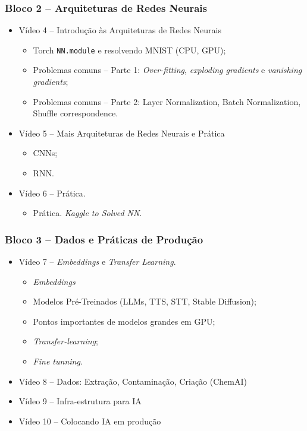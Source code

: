 \documentclass[a4paper,12pt, brazil]{article}
\begin{document}
    \subsubsection*{Bloco 2 -- Arquiteturas de Redes Neurais}
    \begin{itemize}
        \item Vídeo 4 -- Introdução às Arquiteturas de Redes Neurais
        \begin{itemize}
            \item Torch \verb|NN.module| e resolvendo MNIST (CPU, GPU);
            \item Problemas comuns -- Parte 1: \emph{Over-fitting}, \emph{exploding gradients} e \emph{vanishing gradients};
            \item Problemas comuns -- Parte 2: Layer Normalization, Batch Normalization, Shuffle correspondence.
        \end{itemize}
        
        \item Vídeo 5 -- Mais Arquiteturas de Redes Neurais e Prática
        \begin{itemize}
            \item CNNs;
            \item RNN.
        \end{itemize}
        
        \item Vídeo 6 -- Prática.
        \begin{itemize}
            \item Prática. \emph{Kaggle to Solved NN}.
        \end{itemize}
    \end{itemize}
    
    \subsubsection*{Bloco 3 -- Dados e Práticas de Produção}
    \begin{itemize}
        \item Vídeo 7 -- \emph{Embeddings} e \emph{Transfer Learning}.
        \begin{itemize}
            \item \emph{Embeddings}
            \item Modelos Pré-Treinados (LLMs, TTS, STT, Stable Diffusion);
            \item Pontos importantes de modelos grandes em GPU;
            \item \emph{Transfer-learning};
            \item \emph{Fine tunning}.
        \end{itemize}
        
        
        \item Vídeo 8 -- Dados: Extração, Contaminação, Criação (ChemAI)
    
        
        \item Vídeo 9 -- Infra-estrutura para IA
        
        \item Vídeo 10 -- Colocando IA em produção
    \end{itemize}
    
\end{document}
